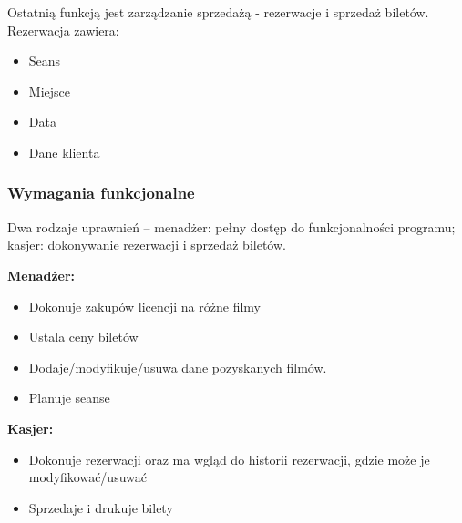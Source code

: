 \documentclass{article}
\begin{document}
	\par Ostatnią funkcją jest zarządzanie sprzedażą - rezerwacje i sprzedaż biletów. Rezerwacja zawiera:
	\begin{multicols}{2}
		\begin{itemize}
			\item Seans
			\item Miejsce
			\item Data
			\item Dane klienta
		\end{itemize}
	\end{multicols}
	
	\subsubsection{Wymagania funkcjonalne}
	\par Dwa rodzaje uprawnień – menadżer: pełny dostęp do funkcjonalności programu; kasjer: dokonywanie rezerwacji i sprzedaż biletów.
	\par \textbf{Menadżer:}
	\begin{itemize}
		\item Dokonuje zakupów licencji na różne filmy
		\item Ustala ceny biletów
		\item Dodaje/modyfikuje/usuwa dane pozyskanych filmów.
		\item Planuje seanse
	\end{itemize}
	\par \textbf{Kasjer:}
	\begin{itemize}
		\item Dokonuje rezerwacji oraz ma wgląd do historii rezerwacji, gdzie może je modyfikować/usuwać
		\item Sprzedaje i drukuje bilety
	\end{itemize}
	
\end{document}
